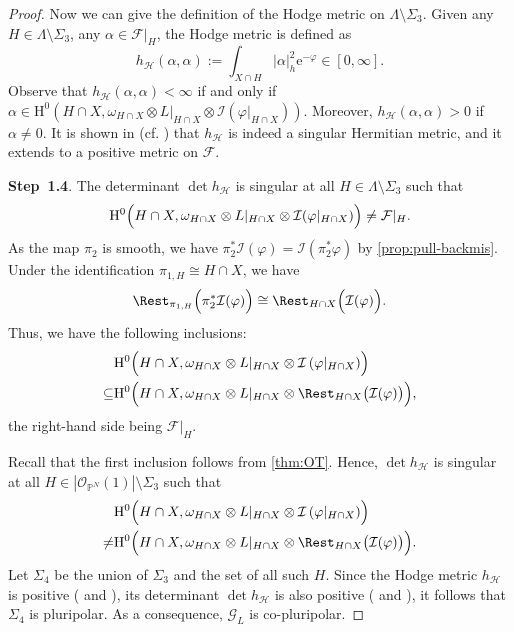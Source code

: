 \begin{proof}
Now we can give the definition of the Hodge metric on $\Lambda\setminus \Sigma_3$.
Given any $H\in \Lambda\setminus \Sigma_3$, any $\alpha\in \mathcal{F}|_H$, the Hodge metric is defined as
\[
h_{\mathcal{H}}(\alpha,\alpha):=\int_{X\cap H} |\alpha|^2_{h}\mathrm{e}^{-\varphi}\in [0,\infty].
\]
Observe that $h_{\mathcal{H}}(\alpha,\alpha)<\infty$ if and only if $\alpha\in \mathrm{H}^0(H\cap X,\omega_{H\cap X}\otimes L|_{H\cap X}\otimes \mathcal{I}(\varphi|_{H\cap X}))$. Moreover, $h_{\mathcal{H}}(\alpha,\alpha)>0$ if $\alpha\neq 0$.
It is shown in \cite{HPS18} (cf. \cite[Theorem~3.3.5]{PT18}) that $h_{\mathcal{H}}$ is indeed a singular Hermitian metric, and it extends to a positive metric on $\mathcal{F}$.

\textbf{Step~1.4}.
The determinant $\det h_{\mathcal{H}}$ is singular at all $H\in \Lambda\setminus \Sigma_3$ such that
\[
\mathrm{H}^0\Bigl(H\cap X,\omega_{H\cap X}\otimes L|_{H\cap X}\otimes \mathcal{I}(\varphi|_{H\cap X})\Bigr)\neq \mathcal{F}|_H.
\]
As the map $\pi_2$ is smooth, we have $\pi_2^*\mathcal{I}(\varphi)= \mathcal{I}(\pi_2^*\varphi)$ by \cref{prop:pull-backmis}.
Under the identification $\pi_{1,H}\cong H\cap X$, we have
\[
\Rest_{\pi_{1,H}}\Bigl(\pi_2^*\mathcal{I}(\varphi)\Bigr)\cong \Rest_{H\cap X}\Bigl(\mathcal{I}(\varphi)\Bigr).
\]
Thus, we have the following inclusions:
\[
\begin{split}
&\mathrm{H}^0\Bigl(H\cap X,\omega_{H\cap X}\otimes L|_{H\cap X}\otimes \mathcal{I}\left(\varphi|_{H\cap X}\right)\Bigr)\\
\subseteq & \mathrm{H}^0\Bigl(H\cap X,\omega_{H\cap X}\otimes L|_{H\cap X}\otimes \Rest_{H\cap X}\bigl(\mathcal{I}(\varphi)\bigr)\Bigr),
\end{split}
\]
the right-hand side being $\mathcal{F}|_H$.

Recall that the first inclusion follows from \cref{thm:OT}.
Hence, $\det h_{\mathcal{H}}$ is singular at all $H\in |\mathcal{O}_{\mathbb{P}^N}(1)|\setminus \Sigma_3$ such that
\[
\begin{split}
&\mathrm{H}^0\Bigl(H\cap X,\omega_{H\cap X}\otimes L|_{H\cap X}\otimes \mathcal{I}\left(\varphi|_{H\cap X}\right)\Bigr)\\
\neq & \mathrm{H}^0\Bigl(H\cap X,\omega_{H\cap X}\otimes L|_{H\cap X}\otimes \Rest_{H\cap X}\bigl(\mathcal{I}(\varphi)\bigr)\Bigr).
\end{split}
\]
Let $\Sigma_4$ be the union of $\Sigma_3$ and the set of all such $H$.
Since the Hodge metric $h_{\mathcal{H}}$ is positive (\cite[Theorem~3.3.5]{PT18} and \cite[Theorem~21.1]{HPS18}),
its determinant $\det h_{\mathcal{H}}$ is also positive (\cite[Proposition~1.3]{Rau15} and \cite[Proposition~25.1]{HPS18}), it follows that $\Sigma_4$ is pluripolar. As a consequence, $\mathcal{G}_{L}$ is co-pluripolar.


\end{proof}
